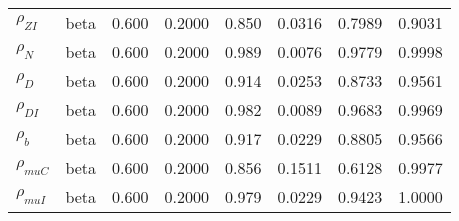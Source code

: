 \begin{center}
\begin{longtable}{llcccccc}
${\rho_{ZI}}$ & beta &   0.600 & 0.2000 &   0.850& 0.0316 &  0.7989 &  0.9031 \\ 
${\rho_N}$ & beta &   0.600 & 0.2000 &   0.989& 0.0076 &  0.9779 &  0.9998 \\ 
${\rho_D}$ & beta &   0.600 & 0.2000 &   0.914& 0.0253 &  0.8733 &  0.9561 \\ 
${\rho_{DI}}$ & beta &   0.600 & 0.2000 &   0.982& 0.0089 &  0.9683 &  0.9969 \\ 
${\rho_b}$ & beta &   0.600 & 0.2000 &   0.917& 0.0229 &  0.8805 &  0.9566 \\ 
${\rho_{muC}}$ & beta &   0.600 & 0.2000 &   0.856& 0.1511 &  0.6128 &  0.9977 \\ 
${\rho_{muI}}$ & beta &   0.600 & 0.2000 &   0.979& 0.0229 &  0.9423 &  1.0000 \\ 
\end{longtable}
 \end{center}
